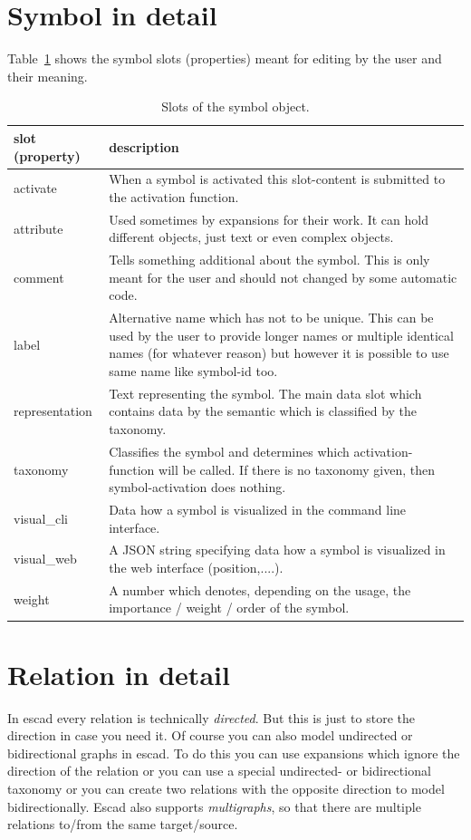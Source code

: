 \documentclass[a4paper, 12pt, openany]{scrbook}
\begin{document}
\section{Symbol in detail}
Table~\ref{tab:symbol} shows the symbol slots (properties) meant for editing by the user and their meaning.
\begin{table}[htbp]
\centering
\begin{tabular}{|p{4cm}|p{12cm}|}
  \hline
  \textbf{slot (property)} & \textbf{description} \\
  \hline
  activate & When a symbol is activated this slot-content is submitted to the activation function. \\
  \hline
  attribute & Used sometimes by expansions for their work. It can hold different objects, just text or even complex objects. \\
  \hline
  comment & Tells something additional about the symbol. This is only meant for the user and should not changed by some automatic code. \\
  \hline
  label & Alternative name which has not to be unique. This can be used by the user to provide longer names or multiple identical names (for whatever reason) but however it is possible to use same name like symbol-id too. \\
  \hline
  representation & Text representing the symbol. The main data slot which contains data by the semantic which is classified by the taxonomy. \\
  \hline
  taxonomy & Classifies the symbol and determines which activation-function will be called. If there is no taxonomy given, then symbol-activation does nothing. \\
  \hline
  visual\_cli & Data how a symbol is visualized in the command line interface. \\
  \hline
  visual\_web & A JSON string specifying data how a symbol is visualized in the web interface (position,....). \\
  \hline
  weight & A number which denotes, depending on the usage, the importance / weight / order of the symbol. \\
  \hline
\end{tabular}
\caption{Slots of the symbol object.}
\label{tab:symbol}
\end{table}
\section{Relation in detail}
In escad every relation is technically \emph{directed}. But this is just to store the direction in case you need it. Of course you can also model undirected or bidirectional graphs in escad. To do this you can use expansions which ignore the direction of the relation or you can use a special undirected- or bidirectional taxonomy or you can create two relations with the opposite direction to model bidirectionally. Escad also supports \emph{multigraphs}, so that there are multiple relations to/from the same target/source.
\end{document}
